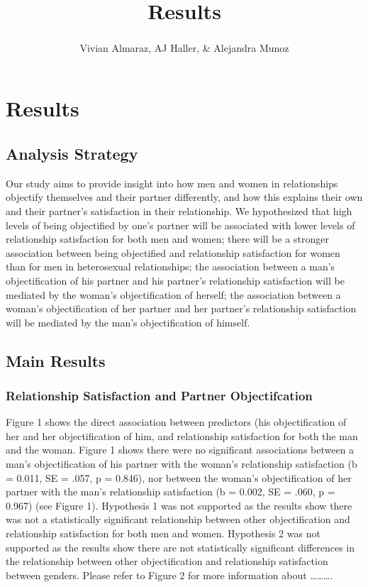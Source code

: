 \documentclass[
  english,
  man]{apa6}
\title{Results}
\author{Vivian Almaraz\textsuperscript{}, AJ Haller\textsuperscript{}, \& Alejandra Munoz\textsuperscript{}}
\date{}
\affiliation{\phantom{0}}
\begin{document}
\maketitle

\hypertarget{results}{%
\section{Results}\label{results}}

\hypertarget{analysis-strategy}{%
\subsection{Analysis Strategy}\label{analysis-strategy}}

Our study aims to provide insight into how men and women in relationships objectify themselves and their partner differently, and how this explains their own and their partner's satisfaction in their relationship. We hypothesized that high levels of being objectified by one's partner will be associated with lower levels of relationship satisfaction for both men and women; there will be a stronger association between being objectified and relationship satisfaction for women than for men in heterosexual relationships; the association between a man's objectification of his partner and his partner's relationship satisfaction will be mediated by the woman's objectification of herself; the association between a woman's objectification of her partner and her partner's relationship satisfaction will be mediated by the man's objectification of himself.

\hypertarget{main-results}{%
\subsection{Main Results}\label{main-results}}

\hypertarget{relationship-satisfaction-and-partner-objectifcation}{%
\subsubsection{Relationship Satisfaction and Partner Objectifcation}\label{relationship-satisfaction-and-partner-objectifcation}}

Figure 1 shows the direct association between predictors (his objectification of her and her objectification of him, and relationship satisfaction for both the man and the woman. Figure 1 shows there were no significant associations between a man's objectification of his partner with the woman's relationship satisfaction (b = 0.011, SE = .057, p = 0.846), nor between the woman's objectification of her partner with the man's relationship satisfaction (b = 0.002, SE = .060, p = 0.967) (see Figure 1). Hypothesis 1 was not supported as the results show there was not a statistically significant relationship between other objectification and relationship satisfaction for both men and women. Hypothesis 2 was not supported as the results show there are not statistically significant differences in the relationship between other objectification and relationship satisfaction between genders. Please refer to Figure 2 for more information about \ldots\ldots\ldots.
\end{document}
